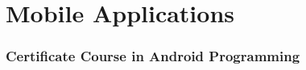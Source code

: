 \section{Mobile Applications}
\begin{frame}
	\frametitle{Certificate Course in Android Programming}
\end{frame}